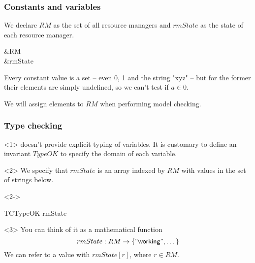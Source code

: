 
\begin{frame}
    \frametitle{Constants and variables}

    We declare $RM$ as the set of all resource managers and $rmState$ as the
    state of each resource manager.
    \begin{tlabox}
        &\CONSTANT RM \\
        &\VARIABLE rmState
    \end{tlabox}

    Every constant value is a set -- even 0, 1 and the string "xyz" --
    but for the former their elements are simply undefined, so we
    can't test if $a \in 0$.

    We will assign elements to $RM$ when performing model checking.
\end{frame}

\begin{frame}
    \frametitle{Type checking}
    \begin{uncoverenv}<1>
        \tlap doesn't provide explicit typing of variables. It is customary to
        define an invariant $TypeOK$ to specify the \alert{domain} of each variable.
    \end{uncoverenv}
    \begin{uncoverenv}<2>
        We specify that $rmState$ is an array indexed by $RM$ with values in
        the set of strings below.
    \end{uncoverenv}
    \begin{uncoverenv}<2->
        \begin{tlabox}
            TCTypeOK  rmState 
        \end{tlabox}
    \end{uncoverenv}
    \begin{uncoverenv}<3>
        You can think of it as a mathematical function
        \[
            rmState: RM \rightarrow \{\textsf{``{working}''}, \dots\}
        \]
        We can refer to a value with $rmState[r]$, where $r \in
        RM$.
    \end{uncoverenv}
\end{frame}

